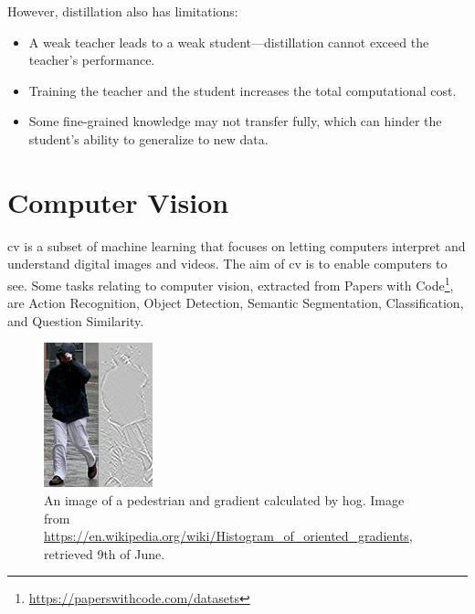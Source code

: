 However, distillation also has limitations:
\begin{itemize}
    \item A weak teacher leads to a weak student—distillation cannot exceed the teacher's performance.
    \item Training the teacher and the student increases the total computational cost.
    \item Some fine-grained knowledge may not transfer fully, which can hinder the student's ability to generalize to new data.
\end{itemize}


\section{Computer Vision} 
\label{sec:computer_vision}

\acrfull{cv} is a subset of machine learning that focuses on letting computers interpret and understand digital images and videos. The aim of \acrlong{cv} is to enable computers to see. Some tasks relating to computer vision, extracted from Papers with Code\footnote{\url{https://paperswithcode.com/datasets}}, are Action Recognition, Object Detection, Semantic Segmentation, Classification, and Question Similarity.

\begin{figure}
    \centering
    \includegraphics[width=0.5\linewidth]{figures/Pedestrian_gradient.jpg}
    \caption{An image of a pedestrian and gradient calculated by \acrshort{hog}. Image from \url{https://en.wikipedia.org/wiki/Histogram_of_oriented_gradients}, retrieved 9th of June.}
    \label{fig:pedestrian_gradient}
\end{figure}

